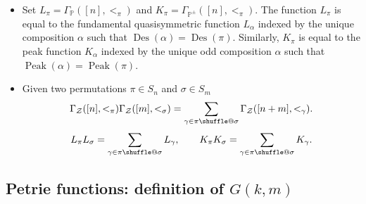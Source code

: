 \documentclass[numbers=enddot,12pt,final,onecolumn,notitlepage]{scrartcl}%
\makeatletter
\newcommand{\al}{\alpha}
\newcommand{\PP}{\mathbb{P}} %
\newcommand{\Des}{\operatorname{Des}}
\newcommand{\Peak}{\operatorname{Peak}}
\providecommand*{\shuffle}{%
  \mathbin{\mathpalette\shuffle@{}}%
}
\newcommand*{\shuffle@}[2]{%
  \sbox0{$#1\vcenter{}$}%
  \kern .15\ht0 %
  \rlap{\vrule height .25\ht0 depth 0pt width 2.5\ht0}%
  \raise.1\ht0\hbox to 2.5\ht0{%
    \vrule height 1.75\ht0 depth -.1\ht0 width .17\ht0 %
    \hfill
    \vrule height 1.75\ht0 depth -.1\ht0 width .17\ht0 %
    \hfill
    \vrule height 1.75\ht0 depth -.1\ht0 width .17\ht0 %
  }%
  \kern .15\ht0 %
}
\newcommand{\0}{\phantom{c}}
\let\sumnonlimits\sum
\renewcommand{\sum}{\sumnonlimits\limits}
\makeatother
\begin{document}
\begin{itemize}
\item Set $L_{\pi}= \Gamma_{\PP}([n],<_\pi)$ and $K_{\pi}= \Gamma_{\PP^\pm}([n],<_\pi)$. The function $L_\pi$ is equal to the fundamental quasisymmetric function $L_\al$ indexed by the unique composition $\al$ such that $\Des(\al) = \Des(\pi)$. Similarly, $K_\pi$ is equal to the peak function $K_\al$ indexed by the unique odd composition $\al$ such that $\Peak(\al) = \Peak(\pi)$. 
\item Given two permutations $\pi \in S_n$ and $\sigma \in S_m$\begin{equation}
\label{eq : GGG}
\Gamma_{\mathcal{Z}}([n],<_\pi)\Gamma_{\mathcal{Z}}([m],<_\sigma) = \sum_{\gamma \in \pi \shuffle \sigma}\Gamma_{\mathcal{Z}}([n+m],<_\gamma) .
\end{equation}
\begin{equation}
L_{\pi}L_{\sigma} = \sum_{\gamma \in \pi \shuffle \sigma}L_{\gamma}, \qquad
K_{\pi}K_{\sigma} = \sum_{\gamma \in \pi \shuffle \sigma}K_{\gamma}.
\end{equation}
\end{itemize}

\subsection{Petrie functions: definition of $G(k,m)$}
\end{document}
